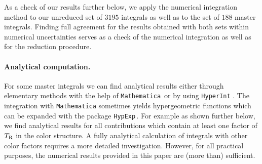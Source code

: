 As a check of our results further below, we apply the numerical integration method
to our unreduced set of $3195$ integrals as well as to the set of $188$ master integrals.
Finding full agreement for the results obtained with both sets within numerical uncertainties
serves as a check of the numerical integration as well as for the reduction procedure.

\paragraph{Analytical computation.}
For some master integrals we can find analytical results either
through elementary methods with the help of
\texttt{Mathematica}\,\cite{Mathematica11.3} or by using
\texttt{HyperInt} \cite{Panzer:2014caa}.
The integration with \texttt{Mathematica} sometimes yields hypergeometric functions which can be expanded with the package \texttt{HypExp}\,\cite{Huber:2005yg,Huber:2007dx}.
For example as shown further below, we
find analytical results for all contributions which contain at least one factor
of $T_\mathrm{R}$ in the color structure. A fully
analytical calculation of integrals with other color factors requires a more
detailed investigation. However, for all practical purposes, the
numerical results provided in this paper are (more than) sufficient.
